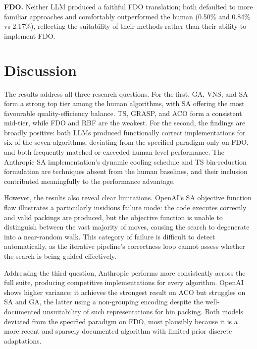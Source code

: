 \documentclass[11pt]{article}
\begin{document}
\textbf{FDO.} Neither LLM produced a faithful FDO translation; both defaulted to more familiar approaches and comfortably outperformed the human (0.50\% and 0.84\% vs 2.17\%), reflecting the suitability of their methods rather than their ability to implement FDO.

\section{Discussion}

The results address all three research questions. For the first, GA, VNS, and SA form a strong top tier among the human algorithms, with SA offering the most favourable quality-efficiency balance. TS, GRASP, and ACO form a consistent mid-tier, while FDO and RBF are the weakest. For the second, the findings are broadly positive: both LLMs produced functionally correct implementations for six of the seven algorithms, deviating from the specified paradigm only on FDO, and both frequently matched or exceeded human-level performance. The Anthropic SA implementation's dynamic cooling schedule and TS bin-reduction formulation are techniques absent from the human baselines, and their inclusion contributed meaningfully to the performance advantage.

However, the results also reveal clear limitations. OpenAI's SA objective function flaw illustrates a particularly insidious failure mode: the code executes correctly and valid packings are produced, but the objective function is unable to distinguish between the vast majority of moves, causing the search to degenerate into a near-random walk. This category of failure is difficult to detect automatically, as the iterative pipeline's correctness loop cannot assess whether the search is being guided effectively.

Addressing the third question, Anthropic performs more consistently across the full suite, producing competitive implementations for every algorithm. OpenAI shows higher variance: it achieves the strongest result on ACO but struggles on SA and GA, the latter using a non-grouping encoding despite the well-documented unsuitability of such representations for bin packing. Both models deviated from the specified paradigm on FDO, most plausibly because it is a more recent and sparsely documented algorithm with limited prior discrete adaptations.
\end{document}
